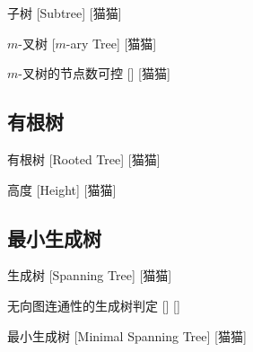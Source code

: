 \documentclass[UTF8]{ctexart}
\begin{document}
            \begin{dfn}
                []
                {子树}
                [Subtree]
                [猫猫]
            \end{dfn}
            
            \begin{dfn}
                []
                {\(m\)-叉树}
                [\(m\)-ary Tree]
                [猫猫]
            \end{dfn}
            
            \begin{ppt}
                []
                {\(m\)-叉树的节点数可控}
                []
                [猫猫]
            \end{ppt}

        \subsection{有根树}
            
            \begin{dfn}
                []
                {有根树}
                [Rooted Tree]
                [猫猫]
            \end{dfn}
            
            \begin{dfn}
                []
                {高度}
                [Height]
                [猫猫]
            \end{dfn}

        \subsection{最小生成树}
            
            \begin{dfn}
                []
                {生成树}
                [Spanning Tree]
                [猫猫]
            \end{dfn}
            
            \begin{ppt}
                []
                {无向图连通性的生成树判定}
                []
                []
            \end{ppt}
            
            \begin{dfn}
                []
                {最小生成树}
                [Minimal Spanning Tree]
                [猫猫]
            \end{dfn}
            
\end{document}
